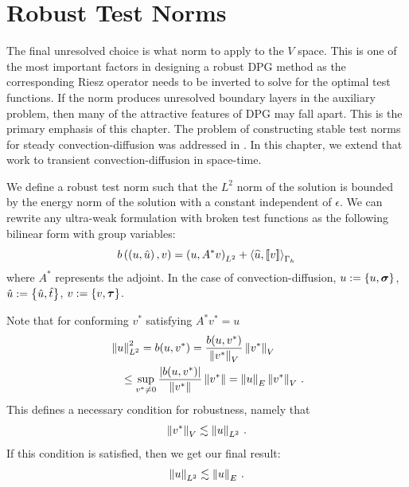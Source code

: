 \documentclass[Dissertation.tex]{subfiles}
\begin{document}
\section{Robust Test Norms}
The final unresolved choice is what norm to apply to the $V$ space.
This is one of the most important factors in designing a robust DPG method as the corresponding Riesz operator 
needs to be inverted to solve for the optimal test functions.
If the norm produces unresolved boundary layers in the auxiliary problem, then many of the attractive features of DPG may fall apart.
This is the primary emphasis of this chapter.
The problem of constructing stable test norms for steady convection-diffusion was addressed in \cite{DemkowiczHeuer,ChanHeuerThanhDemkowicz2012}.
In this chapter, we extend that work to transient convection-diffusion in space-time.

We define a robust test norm such that the $L^2$ norm of the solution 
is bounded by the energy norm of the solution with a constant independent of $\epsilon$.
We can rewrite any ultra-weak formulation with broken test functions as the following
bilinear form with group variables:
\[
b\left( \left( u,\hat u \right),v \right) = \left( u,A^* v \right)_{L^2} + \left\langle \widehat{u}, \left[ \![v]\! \right] \right\rangle_{\Gamma_h}
\]
where $A^*$ represents the adjoint.
In the case of convection-diffusion, $u:=\left\{ u,\boldsymbol\sigma \right\}$, $\hat u:=\left\{ \hat u,\hat t \right\}$, $v:=\left\{ v,\boldsymbol\tau \right\}$.

Note that for conforming $v^*$ satisfying $A^* v^* = u$
\begin{align*}
&\left\| u \right\|_{L^2}^2= b(u,v^*)
=\frac{b(u,v^*)}{\left\| v^* \right\|_V} \left\| v^* \right\|_V\\
&\quad\leq\sup_{v^*\neq0}\frac{|b(u,v^*)|}{\left\| v^* \right\|}\left\| v^* \right\|
=\left\| u \right\|_E \left\| v^* \right\|_V\,.
\end{align*}
This defines a necessary condition for robustness, namely that
\begin{align}
\label{eq:necessaryCondition}
\left\| v^* \right\|_V\lesssim\left\| u \right\|_{L^2}\,.
\end{align}
If this condition is satisfied, then we get our final result:
\begin{align*}
\left\| u \right\|_{L^2}\lesssim\left\| u \right\|_E\,.
\end{align*}
\end{document}
